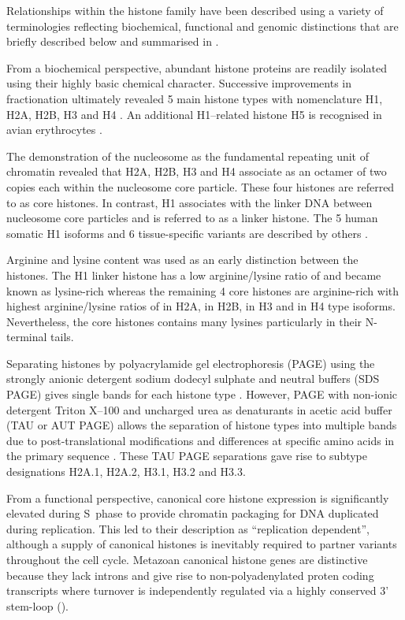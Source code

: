  Relationships within the histone family have been described using a variety of terminologies
  reflecting biochemical, functional and genomic distinctions that are briefly described below
  and summarised in .

  From a biochemical perspective, abundant histone proteins
  are readily isolated using their highly basic chemical character.
  Successive improvements in fractionation ultimately revealed 5 main histone types
  with nomenclature H1, H2A, H2B, H3 and H4 \citep{nomenclature}.
  An additional H1--related histone H5 is recognised in avian erythrocytes \citep{HFive-review}.

  The demonstration of the nucleosome as the fundamental repeating unit of chromatin \citep{Kornberg1974}
  revealed that H2A, H2B, H3 and H4 associate as an octamer of two copies each within the
  nucleosome core particle. These four histones are referred to as core histones.
  In contrast, H1 associates with the linker DNA between nucleosome core particles
  and is referred to as a linker histone.
  The 5 human somatic H1 isoforms and 6 tissue-specific variants are described by others \citep{HarshmanFreitas2013}.

  Arginine and lysine content was used as an early distinction between the histones.
  The H1 linker histone has a low arginine/lysine ratio of \LinkerArgLysRatio{} and became known as lysine-rich
  whereas the remaining 4 core histones are arginine-rich
  with highest arginine/lysine ratios of \HTwoAArgLysRatio{} in H2A, \HTwoBArgLysRatio{} in H2B,
  \HThreeArgLysRatio{} in H3 and \HFourArgLysRatio{} in H4 type isoforms.
  Nevertheless, the core histones contains many lysines particularly in their N-terminal tails.

  Separating histones by polyacrylamide gel electrophoresis (PAGE)
  using the strongly anionic detergent sodium dodecyl sulphate and neutral buffers (SDS PAGE)
  gives single bands for each histone type \citep{ShechterHake2007}.
  However, PAGE with non-ionic detergent Triton X--100 and uncharged urea as denaturants
  in acetic acid buffer (TAU or AUT PAGE) allows the separation of histone types into multiple bands
  due to post-translational modifications and differences at specific amino acids
  in the primary sequence \citep{Zweidler1977}.
  These TAU PAGE separations gave rise to subtype designations H2A.1, H2A.2, H3.1, H3.2 and H3.3.

  From a functional perspective, canonical core histone expression
  is significantly elevated during S~phase to provide chromatin packaging
  for DNA duplicated during replication.
  This led to their description as ``replication dependent'',
  although a supply of canonical histones is inevitably required
  to partner variants throughout the cell cycle.
  Metazoan canonical histone genes are distinctive
  because they lack introns and give rise to non-polyadenylated proten coding transcripts
  where turnover is independently regulated via a highly conserved 3' stem-loop ().

